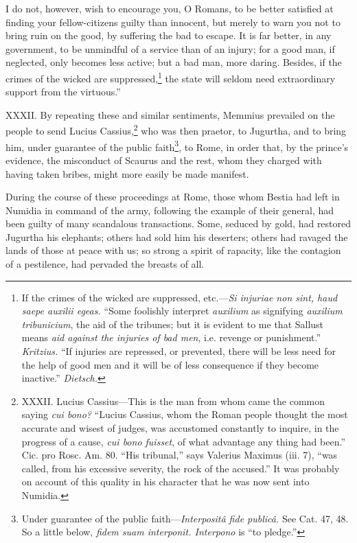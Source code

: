 I do not, however, wish to encourage you, O Romans, to be better
satisfied at finding your fellow-citizens guilty than innocent, but
merely to warn you not to bring ruin on the good, by suffering the bad
to escape. It is far better, in any government, to be unmindful of a
service than of an injury; for a good man, if neglected, only becomes
less active; but a bad man, more daring. Besides, if the crimes of the
wicked are suppressed,\footnote{If the crimes of the wicked are suppressed, etc.—\emph{Si injuriae
non sint, haud saepe auxilii egeas.} ``Some foolishly interpret
\emph{auxilium} as signifying \emph{auxilium tribunicium}, the aid of the
tribunes; but it is evident to me that Sallust means \emph{aid against
the injuries of bad men}, i.e. revenge or punishment.'' \emph{Kritzius.} ``If
injuries are repressed, or prevented, there will be less need for the
help of good men and it will be of less consequence if they become
inactive.'' \emph{Dietsch.}} the state will seldom need extraordinary
support from the virtuous.''

XXXII. By repeating these and similar sentiments, Memmius prevailed on
the people to send Lucius Cassius,\footnote{XXXII. Lucius Cassius—This is the man from whom came the
common saying \emph{cui bono?} ``Lucius Cassius, whom the Roman people
thought the most accurate and wisest of judges, was accustomed
constantly to inquire, in the progress of a cause, \emph{cui bono fuisset},
of what advantage any thing had been.'' Cic. pro Rosc. Am. 80. ``His
tribunal,'' says Valerius Maximus (iii. 7), ``was called, from his
excessive severity, the rock of the accused.'' It was probably on
account of this quality in his character that he was now sent into
Numidia.} who was then praetor, to
Jugurtha, and to bring him, under guarantee of the public faith\footnote{Under guarantee of the public faith—\emph{Interpositâ fide publicâ.}
See Cat. 47, 48. So a little below, \emph{fidem suam interponit. Interpono}
is ``to pledge.''},
to Rome, in order that, by the prince's evidence, the misconduct of
Scaurus and the rest, whom they charged with having taken bribes,
might more easily be made manifest.

During the course of these proceedings at Rome, those whom Bestia had
left in Numidia in command of the army, following the example of their
general, had been guilty of many scandalous transactions. Some, seduced
by gold, had restored Jugurtha his elephants; others had sold him his
deserters; others had ravaged the lands of those at peace with us; so
strong a spirit of rapacity, like the contagion of a pestilence, had
pervaded the breasts of all.

